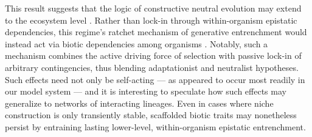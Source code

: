 This result suggests that the logic of constructive neutral evolution may extend to the ecosystem level \citep{muozgmez2021constructive}.
Rather than lock-in through within-organism epistatic dependencies, this regime's ratchet mechanism of generative entrenchment would instead act via biotic dependencies among organisms \citep{Waddington2008}.
Notably, such a mechanism combines the active driving force of selection with passive lock-in of arbitrary contingencies, thus blending adaptationist and neutralist hypotheses.
Such effects need not only be self-acting --- as appeared to occur most readily in our model system --- and it is interesting to speculate how such effects may generalize to networks of interacting lineages.
Even in cases where niche construction is only transiently stable, scaffolded biotic traits may nonetheless persist by entraining lasting lower-level, within-organism epistatic entrenchment.



